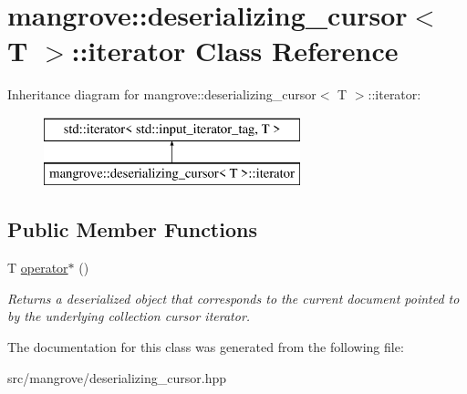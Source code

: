 \hypertarget{classmangrove_1_1deserializing__cursor_1_1iterator}{}\section{mangrove\+:\+:deserializing\+\_\+cursor$<$ T $>$\+:\+:iterator Class Reference}
\label{classmangrove_1_1deserializing__cursor_1_1iterator}
Inheritance diagram for mangrove\+:\+:deserializing\+\_\+cursor$<$ T $>$\+:\+:iterator\+:\begin{figure}[H]
\begin{center}
\leavevmode
\includegraphics[height=2.000000cm]{classmangrove_1_1deserializing__cursor_1_1iterator}
\end{center}
\end{figure}
\subsection*{Public Member Functions}
\begin{DoxyCompactItemize}
\item 
T \hyperlink{classmangrove_1_1deserializing__cursor_1_1iterator_ae1f29c4a14cef45e2a259e17b3297a8e}{operator$\ast$} ()\hypertarget{classmangrove_1_1deserializing__cursor_1_1iterator_ae1f29c4a14cef45e2a259e17b3297a8e}{}\label{classmangrove_1_1deserializing__cursor_1_1iterator_ae1f29c4a14cef45e2a259e17b3297a8e}

\begin{DoxyCompactList}\small\item\em Returns a deserialized object that corresponds to the current document pointed to by the underlying collection cursor iterator. \end{DoxyCompactList}\end{DoxyCompactItemize}


The documentation for this class was generated from the following file\+:\begin{DoxyCompactItemize}
\item 
src/mangrove/deserializing\+\_\+cursor.\+hpp\end{DoxyCompactItemize}
